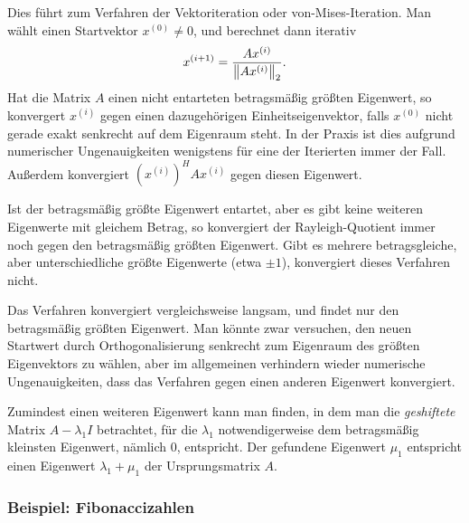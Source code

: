 Dies führt zum Verfahren der Vektoriteration oder von-Mises-Iteration.
Man wählt einen Startvektor $x^{(0)}\neq 0$, und berechnet dann
iterativ
\begin{equation}
  x^{(i+1)} = \frac{A x^{(i)}}{\left\lVert{A x^{(i)}}\right\rVert_2}.
\end{equation}
Hat die Matrix $A$ einen nicht entarteten betragsmäßig größten
Eigenwert, so konvergert $x^{(i)}$ gegen einen dazugehörigen
Einheitseigenvektor, falls $x^{(0)}$ nicht gerade exakt senkrecht auf
dem Eigenraum steht. In der Praxis ist dies aufgrund numerischer
Ungenauigkeiten wenigstens für eine der Iterierten immer der
Fall. Außerdem konvergiert $\left(x^{(i)}\right)^HAx^{(i)}$ gegen
diesen Eigenwert.

Ist der betragsmäßig größte Eigenwert entartet, aber es gibt keine
weiteren Eigenwerte mit gleichem Betrag, so konvergiert der
Rayleigh-Quotient immer noch gegen den betragsmäßig größten
Eigenwert. Gibt es mehrere betragsgleiche, aber unterschiedliche
größte Eigenwerte (etwa $\pm 1$), konvergiert dieses Verfahren nicht.

Das Verfahren konvergiert vergleichsweise langsam, und findet nur den
betragsmäßig größten Eigenwert. Man könnte zwar versuchen, den neuen
Startwert durch Orthogonalisierung senkrecht zum Eigenraum des größten
Eigenvektors zu wählen, aber im allgemeinen verhindern wieder numerische
Ungenauigkeiten, dass das Verfahren gegen einen anderen Eigenwert
konvergiert.

Zumindest einen weiteren Eigenwert kann man finden, in dem man die
\emph{geshiftete} Matrix $A - \lambda_1I$ betrachtet, für die
$\lambda_1$ notwendigerweise dem betragsmäßig kleinsten Eigenwert,
nämlich 0, entspricht. Der gefundene Eigenwert $\mu_1$ entspricht
einen Eigenwert $\lambda_1 + \mu_1$ der Ursprungsmatrix $A$.

\subsubsection{Beispiel: Fibonaccizahlen}

